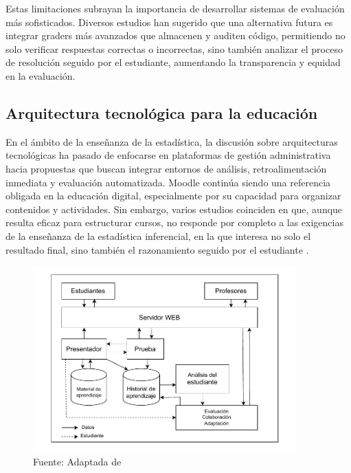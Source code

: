 \documentclass[letter,oneside,12pt,spanish]{report}
\begin{document}
Estas limitaciones subrayan la importancia de desarrollar sistemas de evaluación más sofisticados. Diversos estudios han sugerido que una alternativa futura es integrar graders más avanzados que almacenen y auditen código, permitiendo no solo verificar respuestas correctas o incorrectas, sino también analizar el proceso de resolución seguido por el estudiante, aumentando la transparencia y equidad en la evaluación.


\subsection{Arquitectura tecnológica para la educación}

En el ámbito de la enseñanza de la estadística, la discusión sobre arquitecturas tecnológicas ha pasado de enfocarse en plataformas de gestión administrativa hacia propuestas que buscan integrar entornos de análisis, retroalimentación inmediata y evaluación automatizada. Moodle continúa siendo una referencia obligada en la educación digital, especialmente por su capacidad para organizar contenidos y actividades. Sin embargo, varios estudios coinciden en que, aunque resulta eficaz para estructurar cursos, no responde por completo a las exigencias de la enseñanza de la estadística inferencial, en la que interesa no solo el resultado final, sino también el razonamiento seguido por el estudiante \parencite{Pacheco2025, Ndibalema2025}.

\begin{figure}[ht]
    \centering
    \includegraphics[width=0.9\textwidth]{Figs/Arquitectura_E-learning.pdf}
    \label{fig:architecture_E-learning}
    \\Fuente: Adaptada de \textcite{Mostefai2025}
\end{figure}
\end{document}
